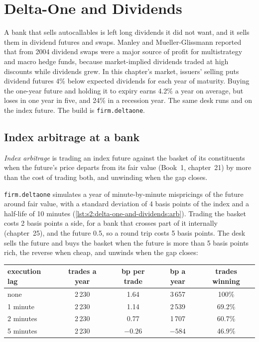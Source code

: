 \chapter{Delta-One and Dividends}\label{ch:s2:delta-one-and-dividends}

A bank that sells autocallables is left long dividends it did not want, and it sells them in dividend futures and swaps. Manley and Mueller-Glissmann
reported that from 2004 dividend swaps were a major source of profit for multistrategy and macro hedge funds, because market-implied dividends traded at
high discounts while dividends grew. In this chapter's market, issuers' selling puts dividend futures 4\% below expected dividends for each year of
maturity. Buying the one-year future and holding it to expiry earns 4.2\% a year on average, but loses in one year in five, and 24\% in a recession
year. The same desk runs  and  on the index future. The build is \texttt{firm.deltaone}.

\section{Index arbitrage at a bank}

\begin{definition}\label{def:s2:delta-one-and-dividends:indexarb}
\emph{Index arbitrage} is trading an index future against the basket of its constituents when the future's price departs from
its fair value (Book~1, chapter~21) by more than the cost of trading both, and unwinding when the gap closes.
\end{definition}

\texttt{firm.deltaone} simulates a year of minute-by-minute mispricings of the future around fair value, with a standard deviation of 4 basis points
of the index and a half-life of 10 minutes (\cref{lst:s2:delta-one-and-dividends:arb}). Trading the basket costs 2 basis points a side, for a bank that
crosses part of it internally (chapter~25), and the future 0.5, so a round trip costs 5 basis points. The desk sells the future and buys the basket when
the future is more than 5 basis points rich, the reverse when cheap, and unwinds when the gap closes:

\begin{center}
\small
\begin{tabular}{@{}lcccc@{}}
\toprule
execution lag & trades a year & bp per trade & bp a year & trades winning\\
\midrule
none & 2\,230 & 1.64 & 3\,657 & 100\%\\
1 minute & 2\,230 & 1.14 & 2\,539 & 69.2\%\\
2 minutes & 2\,230 & 0.77 & 1\,707 & 60.7\%\\
5 minutes & 2\,230 & $-0.26$ & $-584$ & 46.9\%\\
\bottomrule
\end{tabular}
\end{center}

